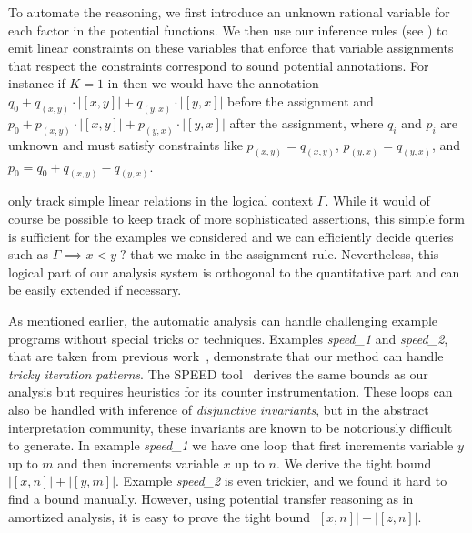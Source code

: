 \documentclass[nocopyrightspace,preprint,pldi]{sigplanconf-pldi15}
\newcommand{\iffull}[2]{\ifx\fullversion\undefined{#2}\else{#1}\fi}
\newcommand{\pref}[1]{\prettyref{#1}}
\begin{document}
To automate the reasoning, we first introduce an unknown rational
variable for each factor in the potential functions.  We then use our
inference rules (see \pref{sec:AAA}) to emit linear constraints on
these variables that enforce that variable assignments that respect
the constraints correspond to sound potential annotations.  For
instance if $K = 1$ in \pref{fig:ex1} then we would have the
annotation $q_0 + q_{(x,y)} {\cdot} |[x,y]| + q_{(y,x)} {\cdot}
|[y,x]|$ before the assignment and $p_0 + p_{(x,y)} {\cdot} |[x,y]| +
p_{(y,x)} {\cdot} |[y,x]|$ after the assignment, where $q_i$ and $p_i$
are unknown and must satisfy constraints like $p_{(x,y)} = q_{(x,y)}$,
$p_{(y,x)} = q_{(y,x)}$, and $p_0 = q_0 + q_{(x,y)} - q_{(y,x)}$.

\iffull{It might be surprising that we}{We} only track simple linear relations in
the logical context $\Gamma$.  While it would of course be possible to keep
track of more sophisticated assertions, this simple form is
sufficient for the examples we considered and we can efficiently
decide queries such as $\Gamma \implies x<y \; ?$ that we make in the
assignment rule.  Nevertheless, this logical part of our analysis
system is orthogonal to the quantitative part and can be easily
extended if necessary.

As mentioned earlier, the automatic analysis can handle challenging example
programs without special tricks or techniques.  Examples
\emph{speed\_1} and \emph{speed\_2}, that are taken from previous
work~\cite{GulwaniMC09},  demonstrate that our method can handle
\emph{tricky iteration patterns}.  The SPEED tool~\cite{GulwaniMC09}
derives the same bounds as our analysis but requires heuristics for
its counter instrumentation.  These loops can also be handled with inference of
\emph{disjunctive invariants}, but in the abstract interpretation
community, these invariants are known to be notoriously difficult to
generate.
%
In example \emph{speed\_1} we have one loop that first increments
variable $y$ up to $m$ and then increments variable $x$ up to $n$.  We
derive the tight bound $|[x, n]| + |[y, m]|$.
%
Example \emph{speed\_2} is even trickier, and we found it hard to
find a bound manually.  However, using potential transfer reasoning as
in amortized analysis, it is easy to prove the tight bound
$|[x, n]| + |[z, n]|$.
\end{document}
